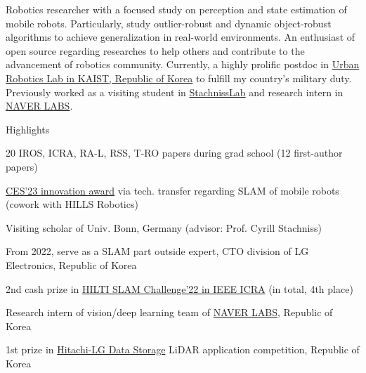

\begin{cvparagraph}

Robotics researcher with a focused study on perception and state estimation of mobile robots.
Particularly, study outlier-robust and dynamic object-robust algorithms to achieve generalization in real-world environments.
An enthusiast of open source regarding researches to help others and contribute to the advancement of robotics community.
Currently, a highly prolific postdoc in \href{https://urobot.kaist.ac.kr/}{Urban Robotics Lab in KAIST, Republic of Korea} to fulfill my country's military duty.
Previously worked as a visiting student in \href{https://www.ipb.uni-bonn.de/}{StachnissLab} and research intern in \href{https://www.naverlabs.com/}{NAVER LABS}.
\end{cvparagraph}

\newcommand{\lineintv}{\vspace{0.0cm}} %

\cventry
  {} %
  {Highlights\vspace{-0.3cm}} %
  {} %
  {} %
  {
    \begin{cvitems} %
      \item {20 IROS, ICRA, RA-L, RSS, T-RO papers during grad school (12 first-author papers)\lineintv}
      \item {\href{https://www.ces.tech/innovation-awards/honorees/2023/honorees/h/hi-bot-hologram-image-guide-robot.aspx}{CES'23 innovation award} via tech. transfer regarding SLAM of mobile robots (cowork with HILLS Robotics)\lineintv}
      \item {Visiting scholar of Univ. Bonn, Germany (advisor: Prof. Cyrill Stachniss)\lineintv}
      \item {From 2022, serve as a SLAM part outside expert, CTO division of LG Electronics, Republic of Korea\lineintv}
      \item {2nd cash prize in \href{https://hilti-challenge.com/}{HILTI SLAM Challenge'22 in IEEE ICRA} (in total, 4th place)\lineintv}
      \item {Research intern of vision/deep learning team of \href{https://www.naverlabs.com/}{NAVER LABS}, Republic of Korea\lineintv}
      \item {1st prize in \href{https://hitachi-lg.com/}{Hitachi-LG Data Storage} LiDAR application competition, Republic of Korea\lineintv}
    \end{cvitems}
  }


